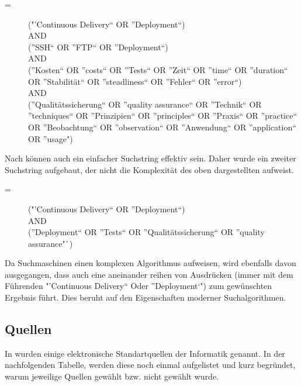 \begin{description}
	\item[ =] ("'Continuous Delivery"` OR "'Deployment"`) \\AND\\ ("'SSH"` OR "'FTP"` OR "'Deployment"`) \\AND\\ ("'Kosten"` OR "'costs"` OR "'Tests"` OR "'Zeit"` OR "'time"` OR "'duration"` OR "'Stabilität"` OR "'steadliness"` OR "'Fehler"` OR "'error"`) \\AND\\ ("'Qualitätssicherung"` OR "'quality assurance"` OR "'Technik"` OR "'techniques"` OR "'Prinzipien"` OR "'principles"` OR "'Praxis"` OR "'practice"` OR "'Beobachtung"` OR "'observation"` OR "'Anwendung"` OR "'application"` OR "'usage")
\end{description}
Nach \cite[vgl. S. 26]{Kitchenham2007} können auch ein einfacher Suchstring effektiv sein. Daher wurde ein zweiter Suchstring aufgebaut, der nicht die Komplexität des oben dargestellten aufweist.
\begin{description}
	\item[ =] ("'Continuous Delivery"` OR "'Deployment"`) \\AND\\ ("'Deployment"` OR "'Tests"` OR "'Qualitätssicherung"` OR "'quality assurance"`)
\end{description}
Da Suchmaschinen einen komplexen Algorithmus aufweisen, wird ebenfalls davon ausgegangen, dass auch eine aneinander reihen von Ausdrücken (immer mit dem Führenden "'Continuous Delivery"` Oder "'Deployment`") zum gewünschten Ergebnis führt. Dies beruht auf den Eigenschaften moderner Suchalgorithmen.

\subsection{Quellen}
\label{subsec:quellen}
In \cite{Kitchenham2007} wurden einige elektronische Standartquellen der Informatik genannt. In der nachfolgenden Tabelle, werden diese noch einmal aufgelistet und kurz begründet, warum jeweilige Quellen gewählt bzw. nicht gewählt wurde.

